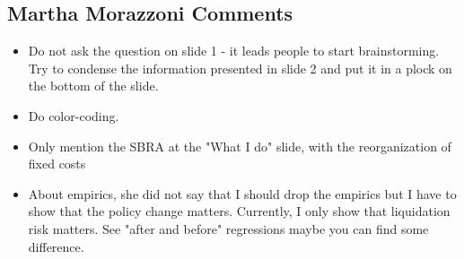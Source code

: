 \documentclass[12pt]{article}
\begin{document}
\subsection*{Martha Morazzoni Comments} 
\begin{itemize} \setlength\itemsep{0em}  \small
    \item Do not ask the question on slide 1 - it leads people to start brainstorming. Try to condense the information presented in slide 2 and put it in a plock on the bottom of the slide. 
    \item Do color-coding. 
    \item Only mention the SBRA at the "What I do" slide, with the reorganization of fixed costs
    \item About empirics, she did not say that I should drop the empirics but I have to show that the policy change matters. Currently, I only show that liquidation risk matters. See "after and before" regressions maybe you can find some difference.
\end{itemize}
\end{document}
